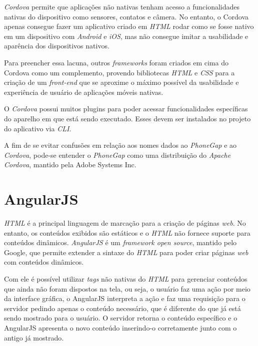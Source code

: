 \textit{Cordova} permite que aplicações não nativas tenham acesso a funcionalidades nativas do dispositivo como sensores, 
contatos e câmera. No entanto, o Cordova apenas consegue fazer um aplicativo criado em 
\textit{HTML} rodar como se fosse nativo em um dispositivo com \textit{Android} e \textit{iOS}, mas não consegue 
imitar a usabilidade e aparência dos dispositivos nativos. 


Para preencher essa lacuna, outros \textit{frameworks} foram criados em cima do Cordova como um complemento, 
provendo bibliotecas \textit{HTML} e \textit{CSS} para a 
criação de um \textit{front-end} que se aproxime o máximo possível da usabilidade e experiência de usuário de 
aplicações móveis nativas.

O \textit{Cordova} possui muitos plugins para poder acessar funcionalidades específicas do aparelho em que está sendo 
executado. Esses devem ser instalados no projeto do aplicativo via \textit{CLI}. 

A fim de se evitar confusões em relação aos nomes dados ao \textit{PhoneGap} e ao \textit{Cordova}, pode-se entender o \textit{PhoneGap} 
como uma distribuição do \textit{Apache Cordova}, mantido pela Adobe Systems Inc. 


\section{AngularJS} \label{sec:angularjs}

\textit{HTML} é a principal linguagem de marcação para a criação de páginas \textit{web}. No entanto, os conteúdos exibidos são estáticos e o \textit{HTML} não fornece suporte para conteúdos dinâmicos.
\textit{AngularJS} é um \textit{framework open source}, mantido pelo Google, que permite extender a sintaxe do \textit{HTML} para poder criar páginas \textit{web} com conteúdos dinâmicos.


Com ele é possível utilizar \textit{tags} não nativas do \textit{HTML} para gerenciar conteúdos que ainda não foram dispostos na tela, ou seja, o usuário faz uma ação por meio da interface gráfica, 
o AngularJS interpreta a ação e faz uma requisição para o servidor pedindo apenas o conteúdo necessário, que é diferente do que já está sendo mostrado para o usuário. 
O servidor retorna o conteúdo específico e o AngularJS apresenta o novo conteúdo inserindo-o corretamente junto com o antigo já mostrado.


